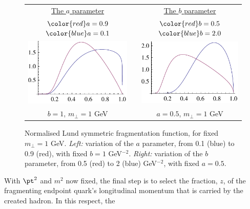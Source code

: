 %
%
\begin{figure}[tp]
\centering
\begin{tabular}{ccc}
\underline{The $a$ parameter} & & \underline{The $b$ parameter}\\[2mm]
 \hspace*{1.8cm}$\color{red}a=0.9$ \hspace*{4mm}
$\color{blue}a=0.1$
 & & \hspace*{1cm}$\color{red}b=0.5$ \hspace*{7mm} $\color{blue}b=2.0$ 
\\
\includegraphics*[scale=1.1]{ffa.pdf} & \hspace*{1cm} &
\includegraphics*[scale=1.1]{ffb.pdf}\\
$b=1$, $m_\perp=1$ GeV & &
$a=0.5$, $m_\perp=1$ GeV 
\end{tabular}
\caption{Normalised Lund symmetric fragmentation
function, for fixed $m_\perp = 1$ GeV. 
{\sl Left:} variation of the $a$ parameter, from 0.1 (blue)
to 0.9 (red), with fixed $b = 1$ GeV$^{-2}$. {\sl Right:}
variation of the $b$ parameter, from 0.5 (red) to 2 (blue) GeV$^{-2}$, 
with fixed $a=0.5$.\label{fig:ffab}}
\end{figure}
With $\pt^2$ and $m^2$ now fixed, the final step is to select the
fraction, $z$, of the fragmenting endpoint quark's longitudinal
momentum that is carried by the created hadron. In this respect, the
